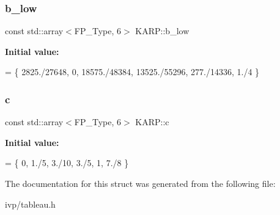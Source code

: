 \subsubsection{\texorpdfstring{b\+\_\+low}{b\_low}}
{\footnotesize\ttfamily const std\+::array$<$F\+P\+\_\+\+Type, 6$>$ K\+A\+R\+P\+::b\+\_\+low}

{\bfseries Initial value\+:}
\begin{DoxyCode}
= \{
    2825./27648, 0, 18575./48384, 13525./55296, 277./14336, 1./4
  \}
\end{DoxyCode}
\mbox{\label{structKARP_a1b174009b3b9f53824e6d59fc92cb56d}} 
\subsubsection{\texorpdfstring{c}{c}}
{\footnotesize\ttfamily const std\+::array$<$F\+P\+\_\+\+Type, 6$>$ K\+A\+R\+P\+::c}

{\bfseries Initial value\+:}
\begin{DoxyCode}
= \{
    0, 1./5, 3./10, 3./5, 1, 7./8
  \}
\end{DoxyCode}


The documentation for this struct was generated from the following file\+:\begin{DoxyCompactItemize}
\item 
ivp/tableau.\+h\end{DoxyCompactItemize}
